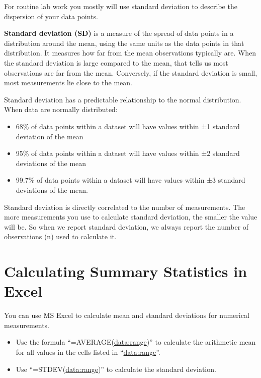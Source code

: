 \documentclass[
]{book}
\providecommand{\tightlist}{%
  \setlength{\itemsep}{0pt}\setlength{\parskip}{0pt}}
\begin{document}
For routine lab work you mostly will use standard deviation to describe the dispersion of your data points.

\textbf{Standard deviation (SD)} is a measure of the spread of data points in a distribution around the mean, using the same units as the data points in that distribution. It measures how far from the mean observations typically are. When the standard deviation is large compared to the mean, that tells us most observations are far from the mean. Conversely, if the standard deviation is small, most measurements lie close to the mean.

Standard deviation has a predictable relationship to the normal distribution. When data are normally distributed:

\begin{itemize}
\tightlist
\item
  68\% of data points within a dataset will have values within ±1 standard deviation of the mean
\item
  95\% of data points within a dataset will have values within ±2 standard deviations of the mean
\item
  99.7\% of data points within a dataset will have values within ±3 standard deviations of the mean.
\end{itemize}

Standard deviation is directly correlated to the number of measurements. The more measurements you use to calculate standard deviation, the smaller the value will be. So when we report standard deviation, we always report the number of observations (n) used to calculate it.

\hypertarget{calculating-summary-statistics-in-excel}{%
\section{Calculating Summary Statistics in Excel}\label{calculating-summary-statistics-in-excel}}

You can use MS Excel to calculate mean and standard deviations for numerical measurements.

\begin{itemize}
\tightlist
\item
  Use the formula ``=AVERAGE(\url{data:range})'' to calculate the arithmetic mean for all values in the cells listed in ``\url{data:range}''.
\item
  Use ``=STDEV(\url{data:range})'' to calculate the standard deviation.
\end{itemize}
\end{document}
